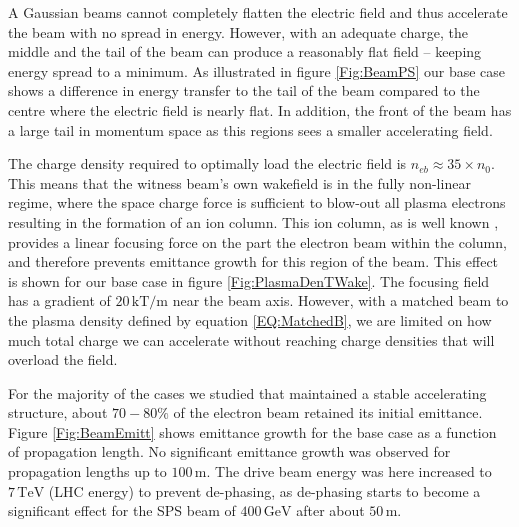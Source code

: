 \documentclass[aps,prstab,reprint,amsmath,amssymb,groupedaddress]{revtex4-1}
\newcommand{\unit}[1]{\,\mathrm{#1}}
\begin{document}
A Gaussian beams cannot completely flatten the electric field and thus accelerate the beam with no spread in energy.
However, with an adequate charge, the middle and the tail of the beam can produce a reasonably flat field -- keeping
energy spread to a minimum. As illustrated in figure \ref{Fig:BeamPS} our base case shows a difference in energy
transfer to the tail of the beam compared to the centre where the electric field is nearly flat. In addition, the front
of the beam has a large tail in momentum space as this regions sees a smaller accelerating field.

The charge density required to optimally load the electric field is $n_{eb} \approx 35\times n_{0}$. This means that the
witness beam's own wakefield is in the fully non-linear regime, where the space charge force is sufficient to blow-out
all plasma electrons resulting in the formation of an ion column. This ion column, as is well known
\cite{rosenzweig:1991}, provides a linear focusing force on the part the electron beam within the column, and therefore
prevents emittance growth for this region of the beam. This effect is shown for our base case in figure
\ref{Fig:PlasmaDenTWake}. The focusing field has a gradient of $20\unit{kT/m}$ near the beam axis. However, with a
matched beam to the plasma density defined by equation \ref{EQ:MatchedB}, we are limited on how much total charge we can
accelerate without reaching charge densities that will overload the field.



For the majority of the cases we studied that maintained a stable accelerating structure, about $70-80\%$ of the
electron beam retained its initial emittance. Figure \ref{Fig:BeamEmitt} shows emittance growth for the base case as a
function of propagation length. No significant emittance growth was observed for propagation lengths up to
$100\unit{m}$. The drive beam energy was here increased to $7\unit{TeV}$ (LHC energy) to prevent de-phasing, as
de-phasing starts to become a significant effect for the SPS beam of $400\unit{GeV}$ after about $50\unit{m}$.
\end{document}
